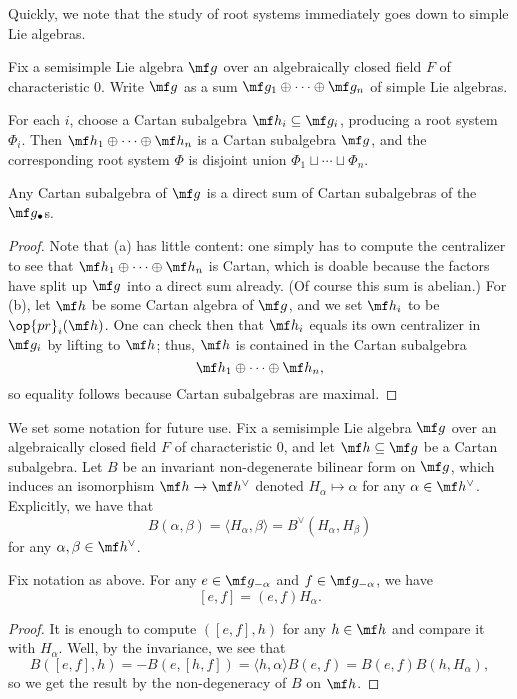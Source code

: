 \documentclass[../notes.tex]{subfiles}
\begin{document}
Quickly, we note that the study of root systems immediately goes down to simple Lie algebras.
\begin{proposition}
	Fix a semisimple Lie algebra $\mf g$ over an algebraically closed field $F$ of characteristic $0$. Write $\mf g$ as a sum $\mf g_1\oplus\cdots\oplus\mf g_n$ of simple Lie algebras.
	\begin{listalph}
		\item For each $i$, choose a Cartan subalgebra $\mf h_i\subseteq\mf g_i$, producing a root system $\Phi_i$. Then $\mf h_1\oplus\cdots\oplus\mf h_n$ is a Cartan subalgebra $\mf g$, and the corresponding root system $\Phi$ is disjoint union $\Phi_1\sqcup\cdots\sqcup\Phi_n$.
		\item Any Cartan subalgebra of $\mf g$ is a direct sum of Cartan subalgebras of the $\mf g_\bullet$s.
	\end{listalph}
\end{proposition}
\begin{proof}
	Note that (a) has little content: one simply has to compute the centralizer to see that $\mf h_1\oplus\cdots\oplus\mf h_n$ is Cartan, which is doable because the factors have split up $\mf g$ into a direct sum already. (Of course this sum is abelian.) For (b), let $\mf h$ be some Cartan algebra of $\mf g$, and we set $\mf h_i$ to be $\op{pr}_i(\mf h)$. One can check then that $\mf h_i$ equals its own centralizer in $\mf g_i$ by lifting to $\mf h$; thus, $\mf h$ is contained in the Cartan subalgebra
	\[\mf h_1\oplus\cdots\oplus\mf h_n,\]
	so equality follows because Cartan subalgebras are maximal.
\end{proof}
We set some notation for future use. Fix a semisimple Lie algebra $\mf g$ over an algebraically closed field $F$ of characteristic $0$, and let $\mf h\subseteq\mf g$ be a Cartan subalgebra. Let $B$ be an invariant non-degenerate bilinear form on $\mf g$, which induces an isomorphism $\mf h\to\mf h^\lor$ denoted $H_\alpha\mapsto\alpha$ for any $\alpha\in\mf h^\lor$. Explicitly, we have that
\[B(\alpha,\beta)=\langle H_\alpha,\beta\rangle=B^\lor(H_\alpha,H_\beta)\]
for any $\alpha,\beta\in\mf h^\lor$.
\begin{lemma}
	Fix notation as above. For any $e\in\mf g_{-\alpha}$ and $f\in\mf g_{-\alpha}$, we have
	\[[e,f]=(e,f)H_\alpha.\]
\end{lemma}
\begin{proof}
	It is enough to compute $([e,f],h)$ for any $h\in\mf h$ and compare it with $H_\alpha$. Well, by the invariance, we see that
	\[B([e,f],h)=-B(e,[h,f])=\langle h,\alpha\rangle B(e,f)=B(e,f)B(h,H_\alpha),\]
	so we get the result by the non-degeneracy of $B$ on $\mf h$.
\end{proof}
\end{document}
